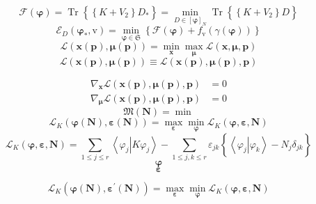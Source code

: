 \documentclass[aps,preprint]{revtex4}%
\begin{document}
\[
\mathcal{F}\left(  \mathbf{\varphi}\right)  =\operatorname{Tr}\left\{
\overset{}{\left\{  K+V_{2}\right\}  D_{\ast}}\right\}  =\min_{D\in\left[
\mathbf{\varphi}\right]  _{N}}\operatorname{Tr}\left\{  \overset{}{\left\{
K+V_{2}\right\}  D}\right\}
\]%
\[
\mathcal{E}_{D}\left(  \mathbf{\varphi}_{\ast}\mathbf{,}\mathrm{v}\right)
=\min_{\mathbf{\varphi\in}\mathfrak{S}}\left\{  \mathcal{F}\left(
\mathbf{\varphi}\right)  +f_{\mathrm{v}}\left(  \gamma\left(  \mathbf{\varphi
}\right)  \right)  \right\}
\]%
\[
\mathcal{L}\left(  \mathbf{x}\left(  \mathbf{p}\right)  \mathbf{,\mu\left(
\mathbf{p}\right)  }\right)  =\min_{\mathbf{x}}\max_{\mathbf{\mu}}%
\mathcal{L}\left(  \mathbf{x,\mu,p}\right)
\]%
\[
\mathcal{L}\left(  \mathbf{x}\left(  \mathbf{p}\right)  \mathbf{,\mu\left(
\mathbf{p}\right)  }\right)  \equiv\mathcal{L}\left(  \mathbf{x}\left(
\mathbf{p}\right)  \mathbf{,\mu\left(  \mathbf{p}\right)  ,p}\right)
\]


%

\begin{align*}
\nabla_{\mathbf{x}}\mathcal{L}\left(  \mathbf{x}\left(  \mathbf{p}\right)
\mathbf{,\mu\left(  \mathbf{p}\right)  ,p}\right)   &  =0\\
\nabla_{\mathbf{\mu}}\mathcal{L}\left(  \mathbf{x\left(  \mathbf{p}\right)
,\mu\left(  \mathbf{p}\right)  ,p}\right)   &  =0
\end{align*}%
\[
\mathfrak{M}\left(  \mathbf{N}\right)  =\min
\]%
\[
\mathcal{L}_{K}\left(  \mathbf{\varphi}\left(  \mathbf{N}\right)
,\mathbf{\varepsilon}\left(  \mathbf{N}\right)  \right)  =\max
_{\mathbf{\varepsilon}}\min_{\mathbf{\varphi}}\mathcal{L}_{K}\left(
\mathbf{\varphi},\mathbf{\varepsilon,N}\right)
\]%
\[
\mathcal{L}_{K}\left(  \mathbf{\varphi},\mathbf{\varepsilon,N}\right)
=\sum_{1\leq j\leq r}\left\langle \left.  \varphi_{j}\right\vert K\varphi
_{j}\right\rangle -\sum_{1\leq j,k\leq r}\varepsilon_{jk}\left\{  \overset
{}{\left\langle \left.  \varphi_{j}\right\vert \varphi_{k}\right\rangle
-N_{j}\delta_{jk}}\right\}
\]%
\[
\mathbf{\varphi}%
\]%
\[
\mathbf{\varepsilon}%
\]
%

\[
\mathcal{L}_{K}\left(  \mathbf{\varphi}\left(  \mathbf{N}\right)
,\mathbf{\varepsilon}^{\prime}\left(  \mathbf{N}\right)  \right)
=\max_{\mathbf{\varepsilon}}\min_{\mathbf{\varphi}}\mathcal{L}_{K}\left(
\mathbf{\varphi},\mathbf{\varepsilon,N}\right)
\]
\end{document}
